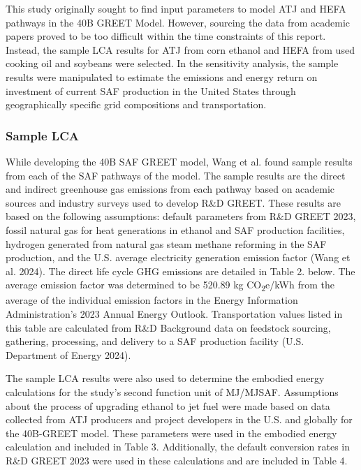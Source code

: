 \documentclass[12pt]{article}
\begin{document}
This study originally sought to find input parameters to model ATJ and  HEFA pathways in the 40B GREET Model. However, sourcing the data from academic papers proved to be too difficult within the time constraints of this report. Instead, the sample LCA results for ATJ from corn ethanol and HEFA from used cooking oil and soybeans were selected. In the sensitivity analysis, the sample results were manipulated to estimate the emissions and energy return on investment of current SAF production in the United States through geographically specific grid compositions and transportation. 

\subsubsection{Sample LCA}

While developing the 40B SAF GREET model, Wang et al. found sample results from each of the SAF pathways of the model. The sample results are the direct and indirect greenhouse gas emissions from each pathway based on academic sources and industry surveys used to develop R\&D GREET. These results are based on the following assumptions: default parameters from R\&D GREET 2023, fossil natural gas for heat generations in ethanol and SAF production facilities, hydrogen generated from natural gas steam methane reforming in the SAF production, and the U.S. average electricity generation emission factor (Wang et al. 2024).  The direct life cycle GHG emissions are detailed in Table 2. below. The average emission factor was determined to be 520.89 kg CO\textsubscript{2}e/kWh from the average of the individual emission factors in the Energy Information Administration's 2023 Annual Energy Outlook. Transportation values listed in this table are calculated from R\&D Background data on feedstock sourcing, gathering, processing, and delivery to a SAF production facility (U.S. Department of Energy 2024). 

The sample LCA results were also used to determine the embodied energy calculations for the study’s second function unit of MJ/MJSAF. Assumptions about the process of upgrading ethanol to jet fuel were made based on data collected from ATJ producers and project developers in the U.S. and globally for the 40B-GREET model. These parameters were used in the embodied energy calculation and included in Table 3. Additionally, the default conversion rates in R\&D GREET 2023 were used in these calculations and are included in Table 4. 
\end{document}
